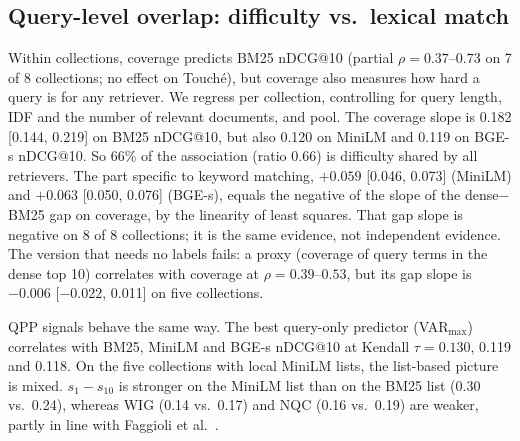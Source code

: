 \documentclass[conference]{IEEEtran}
\makeatletter
\newcommand{\ndcg}{nDCG@10}
\makeatother
\begin{document}
\subsection{Query-level overlap: difficulty vs.\ lexical match}
Within collections, coverage predicts BM25 \ndcg{} (partial $\rho=0.37$--$0.73$ on 7 of 8 collections; no effect on Touch\'e), but coverage also measures how hard a query is for any retriever. We regress per collection, controlling for query length, IDF and the number of relevant documents, and pool. The coverage slope is 0.182 [0.144, 0.219] on BM25 \ndcg{}, but also 0.120 on MiniLM and 0.119 on BGE-s \ndcg{}. So 66\% of the association (ratio 0.66) is difficulty shared by all retrievers. The part specific to keyword matching, $+0.059$ [0.046, 0.073] (MiniLM) and $+0.063$ [0.050, 0.076] (BGE-s), equals the negative of the slope of the dense$-$BM25 gap on coverage, by the linearity of least squares. That gap slope is negative on 8 of 8 collections; it is the same evidence, not independent evidence. The version that needs no labels fails: a proxy (coverage of query terms in the dense top 10) correlates with coverage at $\rho=0.39$--$0.53$, but its gap slope is $-0.006$ [$-0.022$, 0.011] on five collections.

QPP signals behave the same way. The best query-only predictor (VAR$_{\max}$) correlates with BM25, MiniLM and BGE-s \ndcg{} at Kendall $\tau=0.130$, 0.119 and 0.118. On the five collections with local MiniLM lists, the list-based picture is mixed. $s_1-s_{10}$ is stronger on the MiniLM list than on the BM25 list (0.30 vs.\ 0.24), whereas WIG (0.14 vs.\ 0.17) and NQC (0.16 vs.\ 0.19) are weaker, partly in line with Faggioli et al.~\cite{faggioli2023qpp}.
\end{document}
